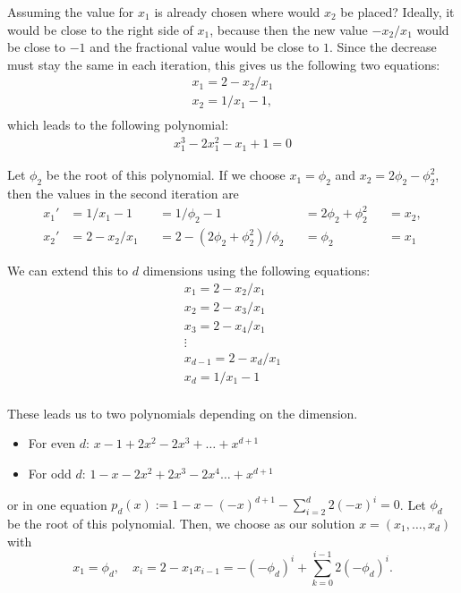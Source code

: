 \documentclass[english,version-2020-11]{uzl-thesis}
\begin{document}
Assuming the value for $x_1$ is already chosen where would $x_2$ be placed?
Ideally, it would be close to the right side of $x_1$, because then the new
value $-x_2 / x_1$ would be close to $-1$ and the fractional value would be
close to $1$.
Since the decrease must stay the same in each iteration, this gives us the
following two equations:
\begin{align*}
  x_1 = 2 - x_2 / x_1 \\
  x_2 = 1 / x_1 - 1,\\
\end{align*}
which leads to the following polynomial:
\begin{align*}
  x_1^3 - 2x_1^2 - x_1 + 1 = 0
\end{align*}

Let $\phi_2$ be the root of this polynomial.
If we choose $x_1 = \phi_2$ and $x_2 = 2\phi_2 - \phi_2^2$,
then the values in the second iteration are
\[\begin{aligned}
  x_1' & = 1 / x_1 - 1   &  & = 1 / \phi_2 - 1                    &  & = 2\phi_2 + \phi_2^2 &  & = x_2, \\
  x_2' & = 2 - x_2 / x_1 &  & = 2 - (2\phi_2 + \phi_2^2) / \phi_2 &  & = \phi_2             &  & = x_1
\end{aligned}\]

We can extend this to $d$ dimensions using the following equations:
\begin{align*}
  x_1 = 2 - x_2 / x_1 \\
  x_2 = 2 - x_3 / x_1 \\
  x_3 = 2 - x_4 / x_1 \\
  \vdots \\
  x_{d-1} = 2 - x_d / x_1 \\
  x_d = 1 / x_1 - 1 \\
\end{align*}

These leads us to two polynomials depending on the dimension.
\begin{itemize}
  \item For even $d$: $x - 1 + 2 x^2 - 2 x^3 + \dots + x^{d+1}$
  \item For odd $d$: $1 - x - 2 x^2 + 2 x^3 - 2 x^4 \dots + x^{d+1}$
\end{itemize}
or in one equation $p_d(x) := 1 - x - (-x)^{d+1} - \sum_{i = 2}^{d} 2 (-x)^{i} = 0$.
Let $\phi_d$ be the root of this polynomial.
Then, we choose as our solution $x = (x_1, \dots, x_d)$ with
\begin{equation}
  \label{eq:rotate-solution}
  x_1 = \phi_d, \quad x_i = 2 - x_1 x_{i-1} = -(-\phi_d)^i + \sum_{k=0}^{i-1} 2 (-\phi_d)^i.
\end{equation}
\end{document}
